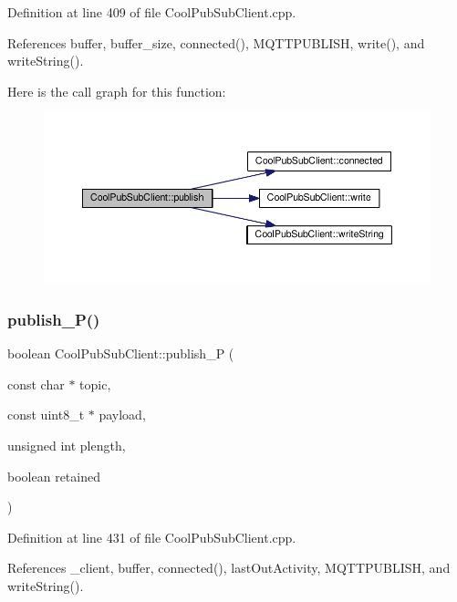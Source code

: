 Definition at line 409 of file Cool\+Pub\+Sub\+Client.\+cpp.



References buffer, buffer\+\_\+size, connected(), M\+Q\+T\+T\+P\+U\+B\+L\+I\+SH, write(), and write\+String().

Here is the call graph for this function\+:
\nopagebreak
\begin{figure}[H]
\begin{center}
\leavevmode
\includegraphics[width=350pt]{d8/d4b/class_cool_pub_sub_client_adef968760eb87b70e3fed03e60da76f7_cgraph}
\end{center}
\end{figure}
\mbox{\label{class_cool_pub_sub_client_a55458d47cf01f590e9b6647d5a418ab6}} 
\subsubsection{\texorpdfstring{publish\+\_\+\+P()}{publish\_P()}}
{\footnotesize\ttfamily boolean Cool\+Pub\+Sub\+Client\+::publish\+\_\+P (\begin{DoxyParamCaption}\item[{const char $\ast$}]{topic,  }\item[{const uint8\+\_\+t $\ast$}]{payload,  }\item[{unsigned int}]{plength,  }\item[{boolean}]{retained }\end{DoxyParamCaption})}



Definition at line 431 of file Cool\+Pub\+Sub\+Client.\+cpp.



References \+\_\+client, buffer, connected(), last\+Out\+Activity, M\+Q\+T\+T\+P\+U\+B\+L\+I\+SH, and write\+String().

